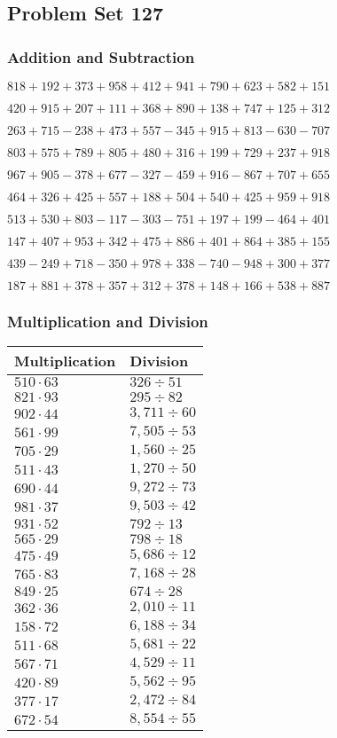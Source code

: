 \hypertarget{problem-set-127}{%
\subsection{Problem Set 127}\label{problem-set-127}}

\hypertarget{addition-and-subtraction}{%
\subsubsection{Addition and
Subtraction}\label{addition-and-subtraction}}

\(818 +192 +373 +958 +412 +941 +790 +623 +582 +151\)

\(420 +915 +207 +111 +368 +890 +138 +747 +125 +312\)

\(263 +715 - 238 +473 +557 - 345 +915 +813 - 630 - 707\)

\(803 +575 +789 +805 +480 +316 +199 +729 +237 +918\)

\(967 +905 - 378 +677 - 327 - 459 +916 - 867 +707 +655\)

\(464 +326 +425 +557 +188 +504 +540 +425 +959 +918\)

\(513 +530 +803 - 117 - 303 - 751 +197 +199 - 464 +401\)

\(147 +407 +953 +342 +475 +886 +401 +864 +385 +155\)

\(439 - 249 +718 - 350 +978 +338 - 740 - 948 +300 +377\)

\(187 +881 +378 +357 +312 +378 +148 +166 +538 +887\)

\hypertarget{multiplication-and-division}{%
\subsubsection{Multiplication and
Division}\label{multiplication-and-division}}

\begin{longtable}[]{@{}ll@{}}
\toprule
Multiplication & Division\tabularnewline
\midrule
\endhead
\(510 \cdot 63\) & \(326 ÷51\)\tabularnewline
\(821 \cdot 93\) & \(295÷82\)\tabularnewline
\(902 \cdot 44\) & \(3,711÷60\)\tabularnewline
\(561 \cdot 99\) & \(7,505÷53\)\tabularnewline
\(705 \cdot 29\) & \(1,560÷25\)\tabularnewline
\(511 \cdot 43\) & \(1,270÷50\)\tabularnewline
\(690 \cdot 44\) & \(9,272÷73\)\tabularnewline
\(981 \cdot 37\) & \(9,503÷42\)\tabularnewline
\(931 \cdot 52\) & \(792÷13\)\tabularnewline
\(565 \cdot 29\) & \(798÷18\)\tabularnewline
\(475 \cdot 49\) & \(5,686÷12\)\tabularnewline
\(765 \cdot 83\) & \(7,168÷28\)\tabularnewline
\(849 \cdot 25\) & \(674÷28\)\tabularnewline
\(362 \cdot 36\) & \(2,010÷11\)\tabularnewline
\(158 \cdot 72\) & \(6,188÷34\)\tabularnewline
\(511 \cdot 68\) & \(5,681÷22\)\tabularnewline
\(567 \cdot 71\) & \(4,529÷11\)\tabularnewline
\(420 \cdot 89\) & \(5,562÷95\)\tabularnewline
\(377 \cdot 17\) & \(2,472÷84\)\tabularnewline
\(672 \cdot 54\) & \(8,554÷55\)\tabularnewline
\bottomrule
\end{longtable}

